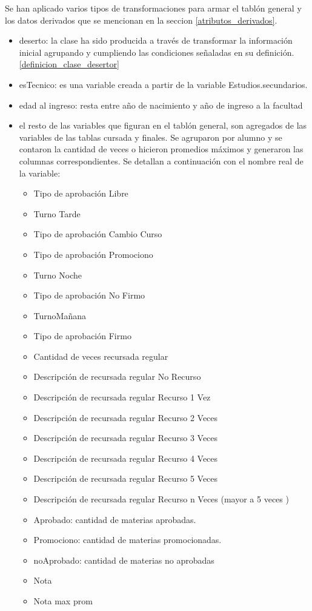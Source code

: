 Se han aplicado varios tipos de transformaciones para armar el tablón general y los datos derivados que se mencionan en la seccion \ref{atributos_derivados}.\\

\begin{itemize}
	\item deserto: la clase ha sido producida a través de transformar la información inicial agrupando y cumpliendo las condiciones señaladas en su definición. \ref{definicion_clase_desertor}
	\item esTecnico: es una variable creada a partir de la variable Estudios.secundarios.
	\item edad al ingreso: resta entre año de nacimiento y año de ingreso a la facultad
	\item el resto de las variables que figuran en el tablón general, son agregados de las variables de las tablas cursada y finales. Se agruparon por alumno y se contaron la cantidad de veces o hicieron promedios máximos y generaron las columnas correspondientes. Se detallan a continuación con el nombre real de la variable: 
	\begin{itemize}
		\item Tipo de aprobación Libre	
		\item Turno Tarde
		\item Tipo de aprobación Cambio Curso
		\item Tipo de aprobación Promociono
		\item Turno Noche
		\item Tipo de aprobación No Firmo
		\item TurnoMañana
		\item Tipo de aprobación Firmo
		\item Cantidad de veces recursada regular
		\item Descripción de recursada regular No Recurso
		\item Descripción de recursada regular Recurso 1 Vez
		\item Descripción de recursada regular Recurso 2 Veces
		\item Descripción de recursada regular Recurso 3 Veces
		\item Descripción de recursada regular Recurso 4 Veces
		\item Descripción de recursada regular Recurso 5 Veces
		\item Descripción de recursada regular Recurso n Veces (mayor a 5 veces )
		\item Aprobado: cantidad de materias aprobadas.
		\item Promociono: cantidad de materias promocionadas.
		\item noAprobado: cantidad de materias no aprobadas
		\item Nota
		\item Nota max prom
	\end{itemize} 
\end{itemize}

